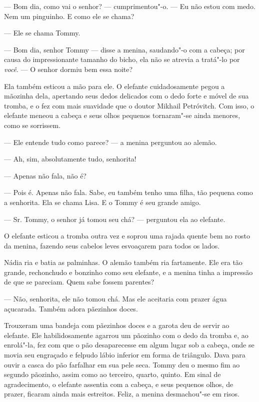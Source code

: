 --- Bom dia, como vai o senhor? --- cumprimentou"-o. --- Eu não estou com
medo. Nem um pinguinho. E como ele se chama?

--- Ele se chama Tommy.

--- Bom dia, senhor Tommy --- disse a menina, saudando"-o com a cabeça;
por causa do impressionante tamanho do bicho, ela não se atrevia a
tratá"-lo por \emph{você}. --- O senhor dormiu bem essa noite?

Ela também esticou a mão para ele. O elefante cuidadosamente pegou a
mãozinha dela, apertando seus dedos delicados com o dedo forte e móvel
de sua tromba, e o fez com mais suavidade que o doutor Mikhail
Petróvitch. Com isso, o elefante meneou a cabeça e seus olhos pequenos
tornaram"-se ainda menores, como se sorrissem.

--- Ele entende tudo como parece? --- a menina perguntou ao alemão.

--- Ah, sim, absolutamente tudo, senhorita!

--- Apenas não fala, não é?

--- Pois é. Apenas não fala. Sabe, eu também tenho uma filha, tão
pequena como a senhorita. Ela se chama Lisa. E o Tommy é seu grande
amigo.

--- Sr. Tommy, o senhor já tomou seu chá? --- perguntou ela ao
elefante.

O elefante esticou a tromba outra vez e soprou uma rajada quente bem no
rosto da menina, fazendo seus cabelos leves esvoaçarem para todos os
lados.

Nádia ria e batia as palminhas. O alemão também ria fartamente. Ele era
tão grande, rechonchudo e bonzinho como seu elefante, e a menina tinha a
impressão de que se pareciam. Quem sabe fossem parentes?

--- Não, senhorita, ele não tomou chá. Mas ele aceitaria com prazer água
açucarada. Também adora pãezinhos doces.

Trouxeram uma bandeja com pãezinhos doces e a garota deu de servir ao
elefante. Ele habilidosamente agarrou um pãozinho com o dedo da tromba
e, ao enrolá"-la, fez com que o pão desaparecesse em algum lugar sob a
cabeça, onde se movia seu engraçado e felpudo lá­bio inferior em forma
de triângulo. Dava para ouvir a casca do pão farfalhar em sua pele seca.
Tommy deu o mesmo fim ao segundo pãozinho, assim como ao terceiro,
quarto, quinto. Em sinal de agradecimento, o elefante assentia com a
cabeça, e seus pequenos olhos, de prazer, ficaram ainda mais estreitos.
Feliz, a menina desmachou"-se em risos.

